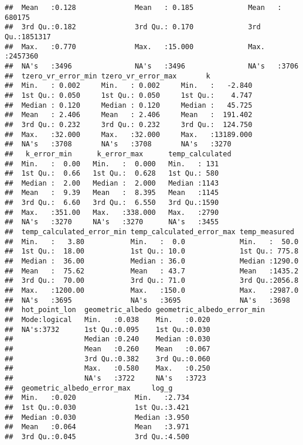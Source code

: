 \documentclass[]{article}
\begin{document}
\begin{verbatim}
##  Mean   :0.128              Mean   : 0.185             Mean   : 680175  
##  3rd Qu.:0.182              3rd Qu.: 0.170             3rd Qu.:1851317  
##  Max.   :0.770              Max.   :15.000             Max.   :2457360  
##  NA's   :3496               NA's   :3496               NA's   :3706     
##  tzero_vr_error_min tzero_vr_error_max       k            
##  Min.   : 0.002     Min.   : 0.002     Min.   :   -2.840  
##  1st Qu.: 0.050     1st Qu.: 0.050     1st Qu.:    4.747  
##  Median : 0.120     Median : 0.120     Median :   45.725  
##  Mean   : 2.406     Mean   : 2.406     Mean   :  191.402  
##  3rd Qu.: 0.232     3rd Qu.: 0.232     3rd Qu.:  124.750  
##  Max.   :32.000     Max.   :32.000     Max.   :13189.000  
##  NA's   :3708       NA's   :3708       NA's   :3270       
##   k_error_min      k_error_max      temp_calculated
##  Min.   :  0.00   Min.   :  0.000   Min.   : 131   
##  1st Qu.:  0.66   1st Qu.:  0.628   1st Qu.: 580   
##  Median :  2.00   Median :  2.000   Median :1143   
##  Mean   :  9.39   Mean   :  8.395   Mean   :1145   
##  3rd Qu.:  6.60   3rd Qu.:  6.550   3rd Qu.:1590   
##  Max.   :351.00   Max.   :338.000   Max.   :2790   
##  NA's   :3270     NA's   :3270      NA's   :3455   
##  temp_calculated_error_min temp_calculated_error_max temp_measured   
##  Min.   :   3.80           Min.   :  0.0             Min.   :  50.0  
##  1st Qu.:  18.00           1st Qu.: 10.0             1st Qu.: 775.8  
##  Median :  36.00           Median : 36.0             Median :1290.0  
##  Mean   :  75.62           Mean   : 43.7             Mean   :1435.2  
##  3rd Qu.:  70.00           3rd Qu.: 71.0             3rd Qu.:2056.8  
##  Max.   :1200.00           Max.   :150.0             Max.   :2987.0  
##  NA's   :3695              NA's   :3695              NA's   :3698    
##  hot_point_lon  geometric_albedo geometric_albedo_error_min
##  Mode:logical   Min.   :0.038    Min.   :0.020             
##  NA's:3732      1st Qu.:0.095    1st Qu.:0.030             
##                 Median :0.240    Median :0.030             
##                 Mean   :0.260    Mean   :0.067             
##                 3rd Qu.:0.382    3rd Qu.:0.060             
##                 Max.   :0.580    Max.   :0.250             
##                 NA's   :3722     NA's   :3723              
##  geometric_albedo_error_max     log_g      
##  Min.   :0.020              Min.   :2.734  
##  1st Qu.:0.030              1st Qu.:3.421  
##  Median :0.030              Median :3.950  
##  Mean   :0.064              Mean   :3.971  
##  3rd Qu.:0.045              3rd Qu.:4.500  

\end{verbatim}
\end{document}
